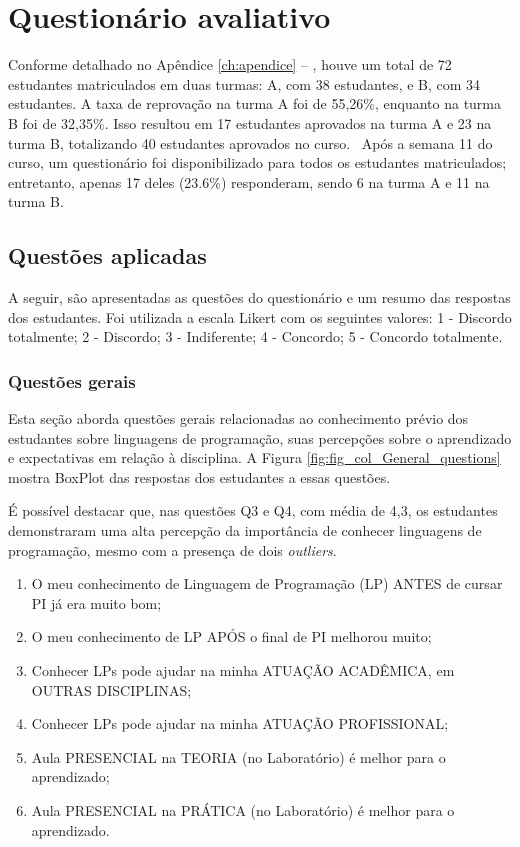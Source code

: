 \section{Questionário avaliativo}

Conforme detalhado no Apêndice \ref{ch:apendice} -- , houve um total de 72 estudantes matriculados em duas turmas: A, com 38 estudantes, e B, com 34 estudantes. A taxa de reprovação na turma A foi de 55,26\%, enquanto na turma B foi de 32,35\%. Isso resultou em 17 estudantes aprovados na turma A e 23 na turma B, totalizando 40 estudantes aprovados no curso.
\
Após a semana 11 do curso, um questionário foi disponibilizado para todos os estudantes matriculados; entretanto, apenas 17 deles (23.6\%) responderam, sendo 6 na turma A e 11 na turma B. 

\subsection{Questões aplicadas}

A seguir, são apresentadas as questões do questionário e um resumo das respostas dos estudantes. Foi utilizada a escala Likert com os seguintes valores: 1 - Discordo totalmente; 2 - Discordo; 3 - Indiferente; 4 - Concordo; 5 - Concordo totalmente.

\subsubsection{Questões gerais}

Esta seção aborda questões gerais relacionadas ao conhecimento prévio dos estudantes sobre linguagens de programação, suas percepções sobre o aprendizado e expectativas em relação à disciplina. A Figura \ref{fig:fig_col_General_questions} mostra BoxPlot \cite{tukey1977box} das respostas dos estudantes a essas questões.

É possível destacar que, nas questões Q3 e Q4, com média de 4,3, os estudantes demonstraram uma alta percepção da importância de conhecer linguagens de programação, mesmo com a presença de dois \textit{outliers}.

\begin{enumerate}[label=\textbf{Q\arabic*.}, itemsep=0pt, parsep=0pt, topsep=0pt, leftmargin=*, before=\ttfamily, after=\normalfont]
    \fontsize{9}{11}\selectfont
    \item O meu conhecimento de Linguagem de Programação (LP) ANTES de cursar PI já era muito bom;
    \item O meu conhecimento de LP APÓS o final de PI melhorou muito;
    \item Conhecer LPs pode ajudar na minha ATUAÇÃO ACADÊMICA, em OUTRAS DISCIPLINAS;
    \item Conhecer LPs pode ajudar na minha ATUAÇÃO PROFISSIONAL;
    \item Aula PRESENCIAL na TEORIA (no Laboratório) é melhor para o aprendizado;
    \item Aula PRESENCIAL na PRÁTICA (no Laboratório) é melhor para o aprendizado.
\end{enumerate}


